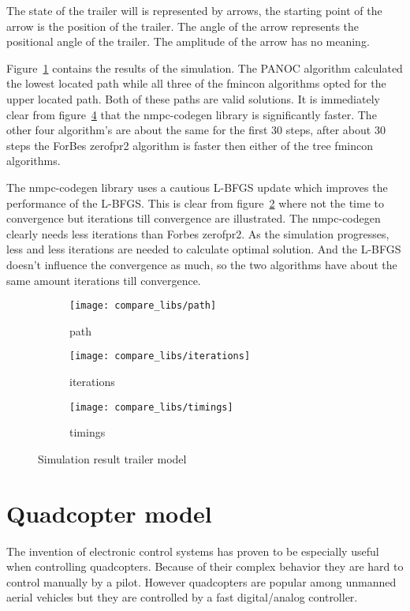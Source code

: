The state of the trailer will is represented by arrows, the starting point of the arrow is the position of the trailer. The angle of the arrow represents the positional angle of the trailer. The amplitude of the arrow has no meaning.

Figure~\ref{fig:solution path trailer example} contains the results of the simulation. The PANOC algorithm calculated the lowest located path while all three of the fmincon algorithms opted for the upper located path. Both of these paths are valid solutions. It is immediately clear from figure~\ref{fig:timings trailer example} that the nmpc-codegen library is significantly faster. The other four algorithm's are about the same for the first 30 steps, after about 30 steps the ForBes zerofpr2 algorithm is faster then either of the tree fmincon algorithms.

The nmpc-codegen library uses a cautious L-BFGS update which improves the performance of the L-BFGS. This is clear from figure~\ref{fig:iterations trailer example} where not the time to convergence but iterations till convergence are illustrated. The nmpc-codegen clearly needs less iterations than  Forbes zerofpr2. As the simulation progresses, less and less iterations are needed to calculate optimal solution. And the L-BFGS doesn't influence the convergence as much, so the two algorithms have about the same amount iterations till convergence.
\begin{figure}[H]
	\centering
	\begin{subfigure}[b]{0.45\textwidth}
		\centering
		\texttt{[image: compare\_libs/path]}
		\caption{path}
		\label{fig:solution path trailer example}
	\end{subfigure}
	
	\begin{subfigure}[b]{0.45\textwidth}
		\centering
		\texttt{[image: compare\_libs/iterations]}
		\caption{iterations}
		\label{fig:iterations trailer example}
	\end{subfigure}
	\hfill
	\begin{subfigure}[b]{0.45\textwidth}
		\centering
		\texttt{[image: compare\_libs/timings]}
		\caption{timings}
		\label{fig:timings trailer example}
	\end{subfigure}
	\caption{Simulation result trailer model}
\end{figure}

\section{Quadcopter model}
The invention of electronic control systems has proven to be especially useful when controlling quadcopters. Because of their complex behavior they are hard to control manually by a pilot. However quadcopters are popular among unmanned aerial vehicles but they are controlled by a fast digital/analog controller.

